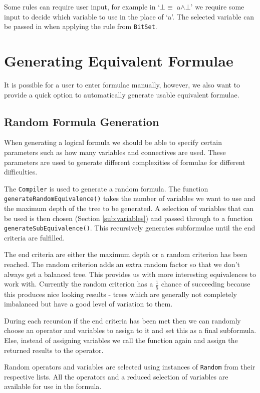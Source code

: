 \documentclass{report}
\begin{document}
Some rules can require user input, for example in `$\bot \equiv$ a$\land\bot$' we require some input to decide which variable to use in the place of `a'. The selected variable can be passed in when applying the rule from {\tt BitSet}.

\section{Generating Equivalent Formulae}
\label{sec:generating_equivalent_formulae}

It is possible for a user to enter formulae manually, however, we also want to provide a quick option to automatically generate usable equivalent formulae.

\subsection{Random Formula Generation}
\label{sub:random_formula_generation}

When generating a logical formula we should be able to specify certain parameters such as how many variables and connectives are used. These parameters are used to generate different complexities of formulae for different difficulties.

The {\tt Compiler} is used to generate a random formula. The function {\tt generateRandomEquivalence()} takes the number of variables we want to use and the maximum depth of the tree to be generated. A selection of variables that can be used is then chosen (Section \ref{sub:variables}) and passed through to a function {\tt generateSubEquivalence()}. This recursively generates subformulae until the end criteria are fulfilled.

The end criteria are either the maximum depth or a random criterion has been reached. The random criterion adds an extra random factor so that we don't always get a balanced tree. This provides us with more interesting equivalences to work with. Currently the random criterion has a $\frac{1}{5}$ chance of succeeding because this produces nice looking results - trees which are generally not completely imbalanced but have a good level of variation to them. 

During each recursion if the end criteria has been met then we can randomly choose an operator and variables to assign to it and set this as a final subformula. Else, instead of assigning variables we call the function again and assign the returned results to the operator.

Random operators and variables are selected using instances of {\tt Random} from their respective lists. All the operators and a reduced selection of variables are available for use in the formula.
\end{document}
